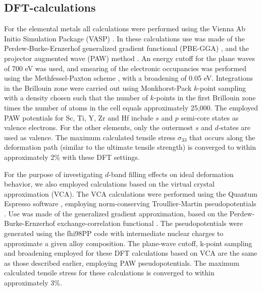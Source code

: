 \documentclass[showpacs,aps,floatfix,prb,reprint,superscriptaddress]{revtex4-1}
\begin{document}
\subsection{DFT-calculations}
For the elemental metals all calculations were performed using the Vienna Ab Initio Simulation Package (VASP) \cite{PhysRevB.54.11169,PhysRevB.47.558}. In these calculations use was made of the Perdew-Burke-Ernzerhof generalized gradient functional (PBE-GGA) \cite{PhysRevLett.77.3865}, and the projector augmented wave (PAW) method \cite{PhysRevB.50.17953,PhysRevB.59.1758}.  An energy cutoff for the plane waves of 700 eV was used, and smearing of the electronic occupancies was performed using the Methfessel-Paxton scheme \cite{PhysRevB.40.3616}, with a broadening of 0.05 eV.  Integrations in the Brillouin zone were carried out using Monkhorst-Pack $k$-point sampling \cite{PhysRevB.13.5188} with a density chosen such that the number of $k$-points in the first Brillouin zone times the number of atoms in the cell equals approximately 25,000. The employed PAW potentials for Sc, Ti, Y, Zr and Hf include $s$ and $p$ semi-core states as valence electrons. For the other elements, only the outermost $s$ and $d$-states are used as valence. The maximum calculated tensile stress $\sigma_{33}$ that occurs along the deformation path (similar to the ultimate tensile strength) is converged to within approximately 2\% with these DFT settings.

For the purpose of investigating $d$-band filling effects on ideal deformation behavior, we also employed calculations based on the virtual crystal approximation (VCA). The VCA calculations were performed using the Quantum Espresso software \cite{giannozzi2009quantum}, employing norm-conserving Troullier-Martin pseudopotentials \cite{troullier1991efficient,romaner2010effect}. Use was made of the generalized gradient approximation, based on the Perdew-Burke-Ernzerhof exchange-correlation functional \cite{PhysRevLett.77.3865}. The pseudopotentials were generated using the fhi98PP code with intermediate nuclear charges \cite{fuchs1999ab} to approximate a given alloy composition. The plane-wave cutoff, k-point sampling and broadening employed for these DFT calculations based on VCA are the same as those described earlier, employing PAW pseudopotentials. The maximum calculated tensile stress for these calculations is converged to within approximately 3\%.
\end{document}
